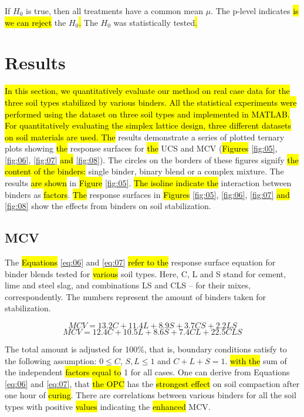 \documentclass[electronics,article,submit,pdftex,moreauthors]{Definitions/mdpi}
\begin{document}
If $H_0$ is true, then all treatments have a common mean $\mu$. The p-level indicates \hl{is we can reject} the $H_0$\hl{. }The $H_0$ was statistically tested\hl{.} 

\section{Results}
\hl{In this section, we quantitatively evaluate our method on real case data for the three soil types stabilized by various binders. All the statistical experiments were performed using the dataset on three soil types and implemented in MATLAB. For quantitatively evaluating the simplex lattice design, three different datasets on soil materials are used. The} results demonstrate a series of plotted ternary plots showing \hl{the} response surfaces for \hl{the} UCS and MCV (\hl{Figures} \ref{fig:05}, \ref{fig:06}, \ref{fig:07} \hl{and} \ref{fig:08}). The circles on the borders of these figures signify \hl{the content of the binders:} single binder, binary blend or a complex mixture. The results \hl{are shown} in \hl{Figure} \ref{fig:05}. \hl{The isoline indicate the} interaction between\hl{ }binders as \hl{factors}.\hl{ The }response surfaces in \hl{Figures} \ref{fig:05}, \ref{fig:06}, \ref{fig:07} \hl{and} \ref{fig:08}\hl{ }show the effects from binders on soil stabilization. 

\subsection{MCV}
The \hl{Equations} \ref{eq:06} and \ref{eq:07} \hl{refer to the} response surface equation for binder blends tested for \hl{various} soil types. Here, C, L and S stand for cement, lime and steel slag, and combinations LS and CLS – for their mixes, correspondently. The numbers represent the amount of binders taken for stabilization.

\begin{equation}\label{eq:06}
	MCV=13.2C+11.4L+8.9S+3.7CS+2.2LS
\end{equation}
\begin{equation}\label{eq:07}
	MCV=12.4C+10.5L+8.6S+7.4CL+22.5CLS
\end{equation}

The total amount is adjusted for 100\%, that is, boundary conditions satisfy to the following assumption:  $0 \le C$, $S, L \le 1$ and $C+L+S = 1$. \hl{with the }sum of the independent \hl{factors equal to} 1 for all cases. One can derive from Equations \ref{eq:06} and \ref{eq:07}, that \hl{the OPC} has the \hl{strongest effect} on soil compaction after one hour of \hl{curing}. There are correlations between various binders for all the soil types with\hl{ }positive \hl{values} indicating the \hl{enhanced} MCV.
\end{document}
